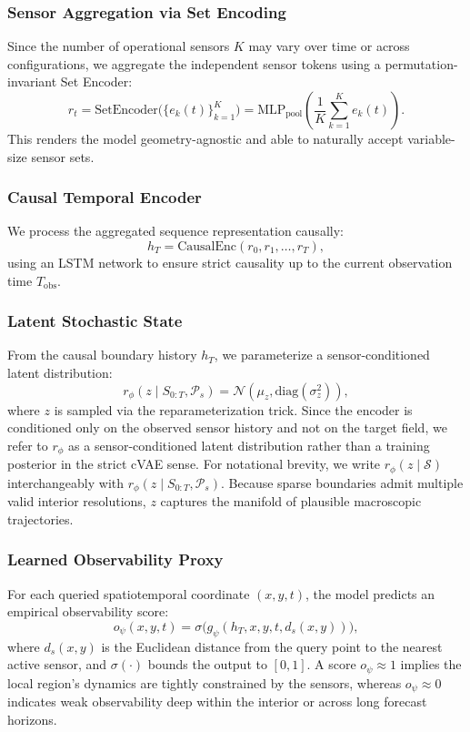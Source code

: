\documentclass[11pt,a4paper]{article}
\begin{document}
\subsubsection{Sensor Aggregation via Set Encoding}
Since the number of operational sensors $K$ may vary over time or across configurations, we aggregate the independent sensor tokens using a permutation-invariant Set Encoder:
\begin{equation}
r_t = \mathrm{SetEncoder}\bigl(\{e_k(t)\}_{k=1}^K\bigr) = \mathrm{MLP}_{\text{pool}}\left(\frac{1}{K}\sum_{k=1}^K e_k(t)\right).
\end{equation}
This renders the model geometry-agnostic and able to naturally accept variable-size sensor sets.

\subsubsection{Causal Temporal Encoder}
We process the aggregated sequence representation causally:
\begin{equation}
h_T = \mathrm{CausalEnc}(r_0, r_1, \dots, r_T),
\end{equation}
using an LSTM network to ensure strict causality up to the current observation time $T_{\mathrm{obs}}$.

\subsubsection{Latent Stochastic State}
From the causal boundary history $h_T$, we parameterize a sensor-conditioned latent distribution:
\begin{equation}
r_\phi(z \mid S_{0:T}, \mathcal{P}_s) = \mathcal{N}(\mu_z, \mathrm{diag}(\sigma_z^2)),
\end{equation}
where $z$ is sampled via the reparameterization trick. Since the encoder is conditioned only on the observed sensor history and not on the target field, we refer to $r_\phi$ as a sensor-conditioned latent distribution rather than a training posterior in the strict cVAE sense. For notational brevity, we write $r_\phi(z \mid \mathcal{S})$ interchangeably with $r_\phi(z \mid S_{0:T}, \mathcal{P}_s)$. Because sparse boundaries admit multiple valid interior resolutions, $z$ captures the manifold of plausible macroscopic trajectories.

\subsubsection{Learned Observability Proxy}
For each queried spatiotemporal coordinate $(x,y,t)$, the model predicts an empirical observability score:
\begin{equation}
o_\psi(x,y,t) = \sigma\bigl(g_\psi(h_T, x, y, t, d_s(x,y))\bigr),
\end{equation}
where $d_s(x,y)$ is the Euclidean distance from the query point to the nearest active sensor, and $\sigma(\cdot)$ bounds the output to $[0,1]$. A score $o_\psi \approx 1$ implies the local region's dynamics are tightly constrained by the sensors, whereas $o_\psi \approx 0$ indicates weak observability deep within the interior or across long forecast horizons.
\end{document}
